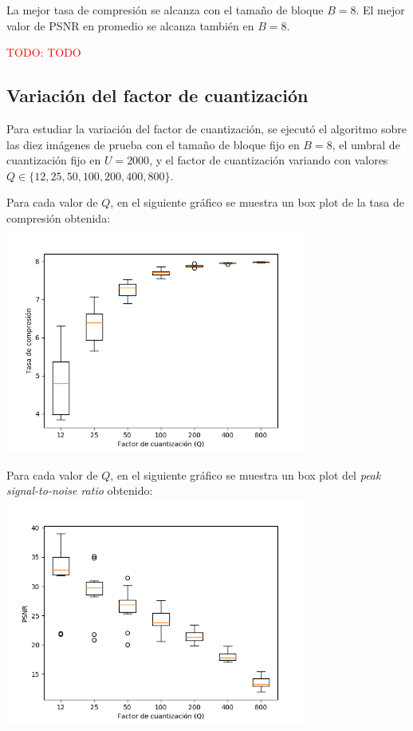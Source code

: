 \documentclass{article}
\newcommand{\set}[1]{\{#1\}}
\newcommand{\TODO}[1]{\textcolor{red}{TODO: #1}}
\begin{document}
La mejor tasa de compresión se alcanza con el tamaño de bloque
$B = 8$. El mejor valor de PSNR en promedio se alcanza también
en $B = 8$.

\TODO{TODO}

\newpage
\subsection{Variación del factor de cuantización}

Para estudiar la variación del factor de cuantización, se ejecutó el
algoritmo sobre las diez imágenes de prueba con el
tamaño de bloque fijo en $B = 8$,
el umbral de cuantización fijo en $U = 2000$,
y el factor de cuantización variando con valores
$Q \in \set{12,25,50,100,200,400,800}$.

Para cada valor de $Q$, en el siguiente gráfico se muestra un
box plot de la tasa de compresión obtenida:\\
\includegraphics[width=10cm]{../imgs/output/gray_plots/q_rate.png}

Para cada valor de $Q$, en el siguiente gráfico se muestra un
box plot del {\em peak signal-to-noise ratio} obtenido:\\
\includegraphics[width=10cm]{../imgs/output/gray_plots/q_psnr.png}
\end{document}
